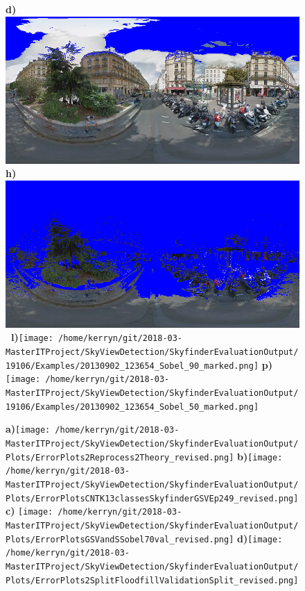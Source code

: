 \documentclass{article}
\begin{document}
\begin{figure}
\textbf{\scriptsize{d)}}\includegraphics[scale=0.13]{Images/2/panorama-JtVHmEl7WCiz1xJ0bcJpBg-1_Sobel_90_marked.png} %
\textbf{\scriptsize{h)}}\includegraphics[scale=0.13]{Images/2/panorama-JtVHmEl7WCiz1xJ0bcJpBg-1_Sobel_50_marked.png} %
\textbf{\scriptsize{~l)}}\texttt{[image: /home/kerryn/git/2018-03-MasterITProject/SkyViewDetection/SkyfinderEvaluationOutput/19106/Examples/20130902\_123654\_Sobel\_90\_marked.png]} %
\textbf{\scriptsize{p)}}\texttt{[image: /home/kerryn/git/2018-03-MasterITProject/SkyViewDetection/SkyfinderEvaluationOutput/19106/Examples/20130902\_123654\_Sobel\_50\_marked.png]} 

\end{figure} 

\clearpage %














\begin{figure}
\centering
\textbf{\scriptsize{a)}}\texttt{[image: /home/kerryn/git/2018-03-MasterITProject/SkyViewDetection/SkyfinderEvaluationOutput/Plots/ErrorPlots2Reprocess2Theory\_revised.png]}
\textbf{\scriptsize{b)}}\texttt{[image: /home/kerryn/git/2018-03-MasterITProject/SkyViewDetection/SkyfinderEvaluationOutput/Plots/ErrorPlotsCNTK13classesSkyfinderGSVEp249\_revised.png]}
\\
\textbf{\scriptsize{c)}}
\texttt{[image: /home/kerryn/git/2018-03-MasterITProject/SkyViewDetection/SkyfinderEvaluationOutput/Plots/ErrorPlotsGSVandSSobel70val\_revised.png]}
\textbf{\scriptsize{d)}}\texttt{[image: /home/kerryn/git/2018-03-MasterITProject/SkyViewDetection/SkyfinderEvaluationOutput/Plots/ErrorPlots2SplitFloodfillValidationSplit\_revised.png]}
\end{figure}
\end{document}
